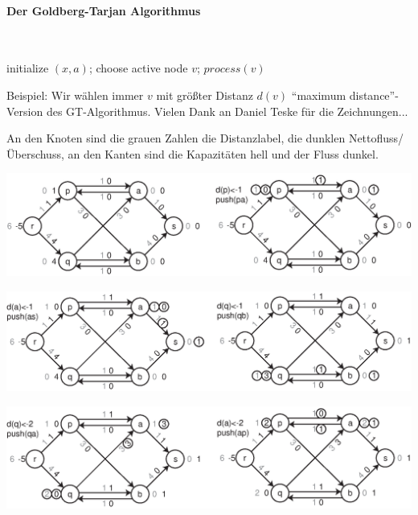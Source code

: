 \paragraph{Der Goldberg-Tarjan Algorithmus} \mbox{}\\
\begin{algorithmic}
\STATE initialize $(x,a)$;
\STATE choose active node $v$;
\STATE $process(v)$
\ENDWHILE
\end{algorithmic}

Beispiel: Wir wählen immer $v$ mit größter Distanz $d(v)$ "`maximum
distance"'-Version des GT-Algorithmus. 
Vielen Dank an Daniel Teske für die Zeichnungen...

An den Knoten sind die grauen Zahlen die Distanzlabel, die dunklen
Nettofluss/Überschuss, an den Kanten sind die Kapazitäten hell und der
Fluss dunkel.



\includegraphics[width=15cm]{bilder/3-0GBTarjan1}

\includegraphics[width=15cm]{bilder/3-0GBTarjan2}

\includegraphics[width=15cm]{bilder/3-0GBTarjan3}

